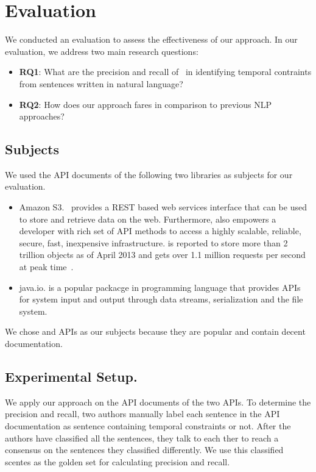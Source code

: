 \section{Evaluation}
\label{sec:evaluation}

We conducted an evaluation to assess the effectiveness of our approach. In our evaluation, we address two main research questions:

\begin{itemize}
	\item\textbf{RQ1}: What are the precision and recall of \tool\  in
	identifying temporal contraints from sentences written in natural language?
	\item\textbf{RQ2}: How does our approach fares in comparison to previous NLP approaches?
\end{itemize}

\subsection{Subjects}
\label{sub:subject}

We used the API documents of the following two libraries as subjects for our evaluation. 
\begin{itemize}
	\item{Amazon S3}. \amazon\ provides a REST based web services interface that can be used to store and retrieve data on the web. Furthermore,  also empowers a developer with rich set of API methods to access a highly scalable, reliable, secure, fast, inexpensive infrastructure.  is reported to store more than 2 trillion objects as of April 2013 and gets over 1.1 million requests per second at peak time~\cite{amazons3stats}.

	\item{java.io}.  is a popular packacge in  programming language that provides APIs for system input and output through data streams, serialization and the file system.
\end{itemize}
We chose  and  APIs as our subjects because they are popular and contain decent documentation.

\subsection{Experimental Setup.} 
We apply our approach on the API documents of the two APIs.
To determine the precision and recall, 
two authors manually label each sentence in the API documentation as sentence containing 
temporal constraints or not. After the authors have classified all the sentences, they 
talk to each ther to reach a consensus on the sentences they classified differently. 
We use this classified scentes as the golden set for calculating precision and recall.

